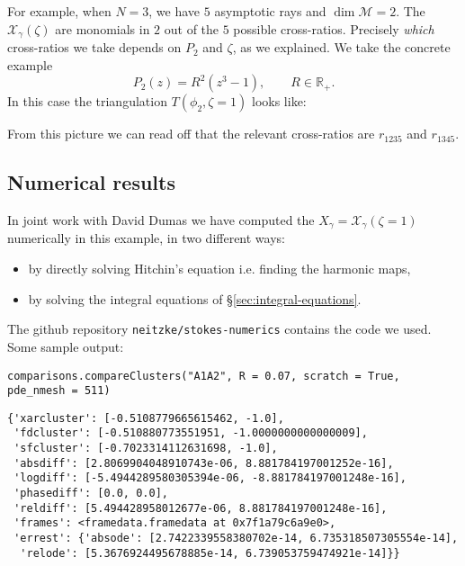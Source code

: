 \documentclass[12pt,letterpaper,reqno]{article}
\numberwithin{equation}{section}
\newcommand{\cM}{\ensuremath{\mathcal M}}
\newcommand{\cX}{\ensuremath{\mathcal X}}
\newcommand{\bbR}{\ensuremath{\mathbb R}}
\newcommand{\ti}[1]{\textit{#1}}
\newcommand{\insfig}[2]{

\medskip
\noindent
\begin{minipage}{\linewidth}

\makebox[\linewidth]{\texttt{[image: figures/\#1-crop.pdf]}}

\end{minipage}
\medskip

}
\begin{document}
For example, when $N=3$, we have $5$ asymptotic rays and $\dim \cM = 2$. The $\cX_\gamma(\zeta)$ are monomials in
$2$ out of the $5$ possible cross-ratios. 
Precisely \ti{which} cross-ratios we take depends on $P_2$ and $\zeta$, as we explained.
We take the concrete example
\begin{equation}
  P_2(z) = R^2 (z^3 - 1), \qquad R \in \bbR_+.
\end{equation}
In this case the triangulation $T(\phi_2, \zeta = 1)$ looks
like:
\insfig{higgs-metric-16}{0.8}
From this picture we can read off that the 
relevant cross-ratios are $r_{1235}$ and $r_{1345}$.

\subsection{Numerical results}

In joint work with David Dumas we 
have computed the $X_\gamma = \cX_\gamma(\zeta = 1)$ numerically
in this example, in two different ways: 
\begin{itemize}
\item by
directly solving Hitchin's equation i.e. finding
the harmonic maps,
\item
by solving the integral equations of \S\ref{sec:integral-equations}.
\end{itemize}

The github repository {\tt neitzke/stokes-numerics} contains the code we used.
Some sample output:
\begin{verbatim}
comparisons.compareClusters("A1A2", R = 0.07, scratch = True, pde_nmesh = 511)
\end{verbatim}
\begin{verbatim}
{'xarcluster': [-0.5108779665615462, -1.0],
 'fdcluster': [-0.510880773551951, -1.0000000000000009],
 'sfcluster': [-0.7023314112631698, -1.0],
 'absdiff': [2.8069904048910743e-06, 8.881784197001252e-16],
 'logdiff': [-5.4944289580305394e-06, -8.881784197001248e-16],
 'phasediff': [0.0, 0.0],
 'reldiff': [5.494428958012677e-06, 8.881784197001248e-16],
 'frames': <framedata.framedata at 0x7f1a79c6a9e0>,
 'errest': {'absode': [2.7422339558380702e-14, 6.735318507305554e-14],
  'relode': [5.3676924495678885e-14, 6.739053759474921e-14]}}
\end{verbatim}
\end{document}
